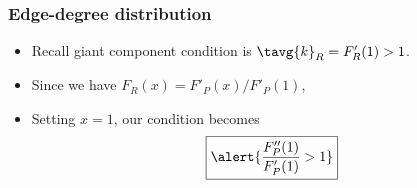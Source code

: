 
\begin{frame}[label=]
  \frametitle{Edge-degree distribution}

  \begin{itemize}
  \item<1-> Recall giant component condition is
    $\tavg{k}_R = F'_R(1) > 1$.
  \item<2->
    Since we have $F_R(x) = F'_P(x)/F'_P(1)$,
  \item<4->
    Setting $x=1$, our condition becomes
    $$
    \boxed{
      \alert{
        \frac{
          F''_P(1)
        }
        {
          F'_P(1)
        }
        > 1
      }}
    $$
  \end{itemize}

\end{frame}

